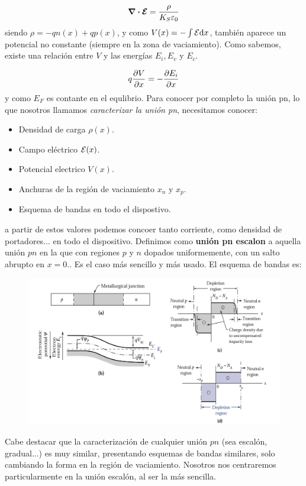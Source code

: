 \begin{equation}
    \div \boldsymbol{\mathcal{E}} = \frac{\rho}{K_S \varepsilon_0}
\end{equation}
siendo $\rho=-qn(x)+qp(x)$, y como $V(x)=-\int \mathcal{E} \mathrm{d} x$, también aparece un potencial no constante (siempre en la zona de vaciamiento). Como sabemos, existe una relación entre $V$ y las energías $E_i,E_v$ y $E_c$. 

\begin{equation*}
    q \frac{\partial V}{\partial x} = - \frac{\partial E_i}{\partial x}
\end{equation*}
y como $E_F$ es contante en el equlibrio. Para conocer por completo la unión pn, lo que nosotros llamamos \textit{caracterizar la unión pn}, necesitamos conocer: 

\begin{itemize}
    \item Densidad de carga $\rho(x)$.
    \item Campo eléctrico $\mathcal{E}(x)$.
    \item Potencial electrico $V(x)$.
    \item Anchuras de la región de vaciamiento $x_n$ y $x_p$.
    \item Esquema de bandas en todo el dispostivo. 
\end{itemize}
a partir de estos valores podemos concoer tanto corriente, como densidad de portadores... en todo el dispositivo. Definimos como \textbf{unión pn escalon} a aquella unión $pn$ en la que con regiones $p$ y $n$ dopados uniformemente, con un salto abrupto en $x=0$.. Es el caso más sencillo y más usado. El esquema de bandas es:

\begin{figure}[h!] \centering
    \includegraphics[width=0.9\linewidth]{Cuerpo/Ch_03/03_Temario_01.png}
\end{figure}
Cabe destacar que la caracterización de cualquier unión $pn$ (sea escalón, gradual...) es muy similar, presentando esquemas de bandas similares, solo cambiando la forma en la región de vaciamiento. Nosotros nos centraremos particularmente en la unión escalón, al ser la más sencilla. 

